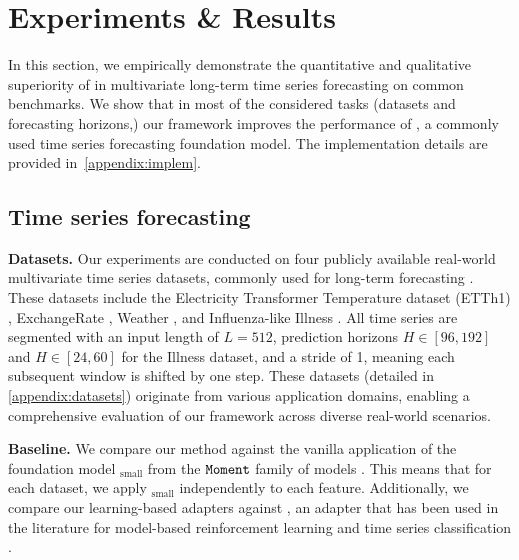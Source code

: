 \section{Experiments \& Results}
\label{sec:exps}

In this section, we empirically demonstrate the quantitative and qualitative superiority of \adapts in multivariate long-term time series forecasting on common benchmarks. We show that in most of the considered tasks (datasets and forecasting horizons,) our framework improves the performance of \moment, a commonly used time series forecasting foundation model. The implementation details are provided in~\cref{appendix:implem}.

\subsection{Time series forecasting}

\noindent\textbf{Datasets.} Our experiments are conducted on four publicly available real-world multivariate time series datasets, commonly used for long-term forecasting \citep{ilbert2024samformer, wu2021autoformer, chen2023tsmixer, nie2023a, Zeng2022AreTE}. These datasets include the Electricity Transformer Temperature dataset (ETTh1) \citep{zhou2021informer}, ExchangeRate \citep{lai2018modelinglongshorttermtemporal}, Weather \citep{weather}, and Influenza-like Illness \citep{illness}. All time series are segmented with an input length of $L = 512$, prediction horizons $H \in [96, 192]$ and $H \in [24, 60]$ for the Illness dataset, and a stride of 1, meaning each subsequent window is shifted by one step. These datasets (detailed in \cref{appendix:datasets}) originate from various application domains, enabling a comprehensive evaluation of our framework across diverse real-world scenarios.

\noindent\textbf{Baseline.} We compare our method against the vanilla application of the foundation model \moment$_{\text{small}}$ from the $\texttt{Moment}$ family of models \citep{goswami2024moment}. This means that for each dataset, we apply \moment$_{\text{small}}$ independently to each feature. Additionally, we compare our learning-based adapters against \pca, an adapter that has been used in the literature for model-based reinforcement learning \citep{benechehab2025zeroshot} and time series classification \citep{feofanov2024adapters}.



